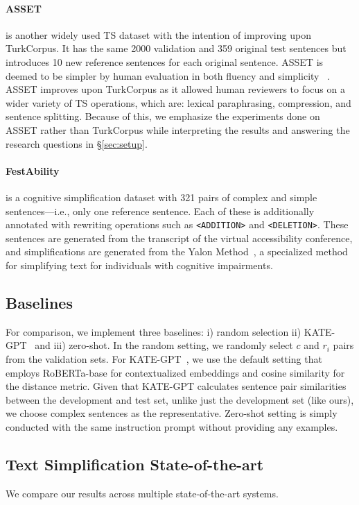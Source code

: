 \documentclass[11pt]{article}
\begin{document}
    \paragraph{ASSET} is another widely used TS dataset with the intention of improving upon TurkCorpus. It has the same 2000 validation and 359 original test sentences but introduces 10 new reference sentences for each original sentence. ASSET is deemed to be simpler by human evaluation in both fluency and simplicity ~\citep{alva-manchego-etal-2020-asset}. ASSET improves upon TurkCorpus as it allowed human reviewers to focus on a wider variety of TS operations, which are: lexical paraphrasing, compression, and sentence splitting. Because of this, we emphasize the experiments done on ASSET rather than TurkCorpus while interpreting the results and answering the research questions in \S \ref{sec:setup}. 
    
    \paragraph{FestAbility} is a cognitive simplification dataset with 321 pairs of complex and simple sentences---i.e., only one reference sentence. Each of these is additionally annotated with rewriting operations such as \texttt{<ADDITION>} and \texttt{<DELETION>}. These sentences are generated from the transcript of the virtual accessibility conference, and simplifications are generated from the Yalon Method~\citep{chamovitz2022cognitive}, a specialized method for simplifying text for individuals with cognitive impairments.

\subsection{Baselines}

    For comparison, we implement three baselines: i) random selection ii) KATE-GPT~\citep{kategpt} and iii) zero-shot. In the random setting, we randomly select $c$ and $r_i$ pairs from the validation sets. For KATE-GPT~\citep{kategpt}, we use the default setting that employs RoBERTa-base for contextualized embeddings and cosine similarity for the distance metric. Given that KATE-GPT calculates sentence pair similarities between the development and test set, unlike just the development set (like ours), we choose complex sentences as the representative. Zero-shot setting is simply conducted with the same instruction prompt without providing any examples.

    
\subsection{Text Simplification State-of-the-art}
\label{ssec:sota}
    We compare our results across multiple state-of-the-art systems.
    
\end{document}
